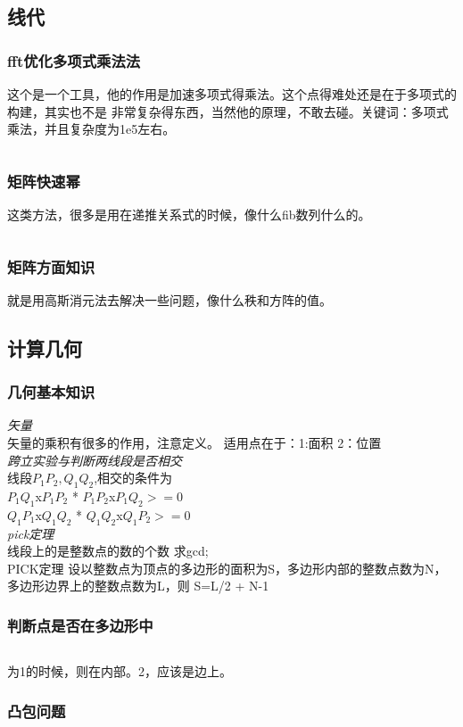 \documentclass[a4paper,11pt]{article}
\begin{document}
\begin{CJK}{UTF8}{gbsn}
\subsection{线代}
\subsubsection{fft优化多项式乘法法}
这个是一个工具，他的作用是加速多项式得乘法。这个点得难处还是在于多项式的构建，其实也不是
非常复杂得东西，当然他的原理，不敢去碰。关键词：多项式乘法，并且复杂度为1e5左右。
\inputminted{c++}{../scoure/math/fft.cpp}
\subsubsection{矩阵快速幂}
这类方法，很多是用在递推关系式的时候，像什么fib数列什么的。
\inputminted{c++}{../scoure/math/ju_quick.cpp}
\subsubsection{矩阵方面知识}
就是用高斯消元法去解决一些问题，像什么秩和方阵的值。
\subsection{计算几何}
\subsubsection{几何基本知识}
\emph{矢量}\\
矢量的乘积有很多的作用，注意定义。
适用点在于：1:面积 2：位置\\
\emph{跨立实验与判断两线段是否相交}\\
线段$P_1P_2,Q_1Q_2$,相交的条件为\\
$P_1Q_1$x$P_1P_2$  *  $P_1P_2$x$P_1Q_2>=0$\\
$Q_1P_1$x$Q_1Q_2$  *  $Q_1Q_2$x$Q_1P_2>=0$\\
\emph{pick定理}\\
线段上的是整数点的数的个数 求gcd;\\
PICK定理 设以整数点为顶点的多边形的面积为S，多边形内部的整数点数为N，多边形边界上的整数点数为L，则 S=L/2 + N-1

\subsubsection{判断点是否在多边形中}
\inputminted{c++}{../scoure/math/jihe.cpp}
为1的时候，则在内部。2，应该是边上。
\subsubsection{凸包问题}
\inputminted{c++}{../scoure/math/tubao.cpp}

\end{CJK}
\end{document}
